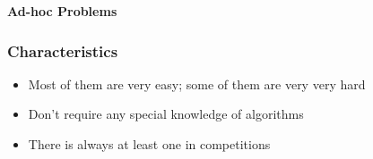 \documentclass{beamer}
\begin{document}
\begin{frame}   
    \vspace*{\fill}
    \begingroup
    \centering
    \begin{center}
        \huge \textbf{Ad-hoc Problems}
    \end{center}
\endgroup
\vspace*{\fill}
\end{frame}

\begin{frame}
    \frametitle{Characteristics}
    \begin{itemize}
            \pause
        \item Most of them are very easy; some of them are very very hard
            \pause
        \item Don't require any special knowledge of algorithms
            \pause
        \item There is always at least one in competitions
    \end{itemize}
\end{frame}
\end{document}

